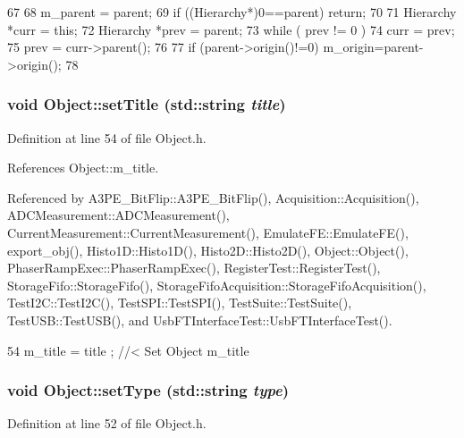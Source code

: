 \begin{DoxyCode}
67                                               {
68   m_parent = parent;
69   if ((Hierarchy*)0==parent) return;
70 
71   Hierarchy *curr = this;
72   Hierarchy *prev = parent;
73   while ( prev != 0 ){
74     curr = prev;
75     prev = curr->parent();
76   }
77   if (parent->origin()!=0) m_origin=parent->origin();
78 }
\end{DoxyCode}
\hypertarget{classObject_a89557dbbad5bcaa02652f5d7fa35d20f}{
\subsubsection[{setTitle}]{\setlength{\rightskip}{0pt plus 5cm}void Object::setTitle (std::string {\em title})}}
\label{classObject_a89557dbbad5bcaa02652f5d7fa35d20f}


Definition at line 54 of file Object.h.

References Object::m\_\-title.

Referenced by A3PE\_\-BitFlip::A3PE\_\-BitFlip(), Acquisition::Acquisition(), ADCMeasurement::ADCMeasurement(), CurrentMeasurement::CurrentMeasurement(), EmulateFE::EmulateFE(), export\_\-obj(), Histo1D::Histo1D(), Histo2D::Histo2D(), Object::Object(), PhaserRampExec::PhaserRampExec(), RegisterTest::RegisterTest(), StorageFifo::StorageFifo(), StorageFifoAcquisition::StorageFifoAcquisition(), TestI2C::TestI2C(), TestSPI::TestSPI(), TestSuite::TestSuite(), TestUSB::TestUSB(), and UsbFTInterfaceTest::UsbFTInterfaceTest().


\begin{DoxyCode}
54 { m_title = title ; } //< Set Object m_title
\end{DoxyCode}
\hypertarget{classObject_aae534cc9d982bcb9b99fd505f2e103a5}{
\subsubsection[{setType}]{\setlength{\rightskip}{0pt plus 5cm}void Object::setType (std::string {\em type})}}
\label{classObject_aae534cc9d982bcb9b99fd505f2e103a5}


Definition at line 52 of file Object.h.


